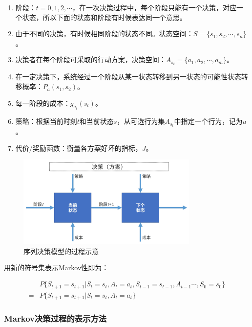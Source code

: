 \begin{enumerate}[itemsep=0pt,parsep=0pt]
    \item 阶段：$t=0,1,2,\cdots$，在一次决策过程中，每个阶段只能有一个决策，对应一个状态，所以下面的状态和阶段有时候表达同一个意思。
    \item 由于不同的决策，有时候相同阶段的状态不同。状态空间：$S=\{s_1,s_2,\cdots,s_n\}$。
    \item 决策者在每个阶段可采取的行动方案，决策空间：$A_{s_t}=\{a_1,a_2,\cdots,a_m\}$。
    \item 在一定决策下，系统经过一个阶段从某一状态转移到另一状态的可能性状态转移概率：$P_a(s_1,s_2)$。
    \item 每一阶段的成本：$g_{a_t}(s_t)$。
    \item 策略：根据当前时刻$t$和当前状态$s$，从可选行为集$A_{s_t}$中指定一个行为，记为$u$。
    \item 代价/奖励函数：衡量各方案好坏的指标，$J$。
\end{enumerate}

\begin{figure}[ht]
    \centering
    \includegraphics[width=0.8\textwidth]{pic/1.1.1.png}
    \caption{序列决策模型的过程示意}
\end{figure}

用新的符号集表示Markov性即为：

\begin{equation}
    \begin{aligned}
         & P\{S_{t+1}=s_{t+1}|S_t=s_t,A_t=a_t,S_{t-1}=s_{t-1},A_{t-1}\cdots,S_0=s_0\} \\=&P\{S_{t+1}=s_{t+1}|S_t=s_t,A_t=a_t\}
    \end{aligned}
\end{equation}

\subsubsection{Markov决策过程的表示方法}

